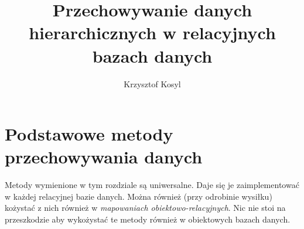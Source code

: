 \documentclass[12pt,a4paper,oneside]{report}
\author{Krzysztof Kosyl}
\title{Przechowywanie danych hierarchicznych w relacyjnych bazach danych}
\begin{document}



\tableofcontents{}






\chapter{Podstawowe metody przechowywania danych}

Metody wymienione w tym rozdziale są uniwersalne. Daje się je zaimplementować w każdej relacyjnej bazie danych. 
Można również (przy odrobinie wysiłku) kożystać z nich również w \emph{mapowaniach obiektowo-relacyjnych}.
Nic nie stoi na przeszkodzie aby wykożystać te metody również w obiektowych bazach danych.

	
	

	

	
	
	
\end{document}
